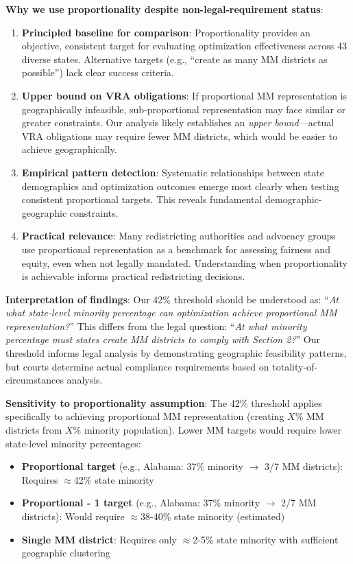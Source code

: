 \textbf{Why we use proportionality despite non-legal-requirement status}:

\begin{enumerate}
    \item \textbf{Principled baseline for comparison}: Proportionality provides an objective, consistent target for evaluating optimization effectiveness across 43 diverse states. Alternative targets (e.g., ``create as many MM districts as possible'') lack clear success criteria.

    \item \textbf{Upper bound on VRA obligations}: If proportional MM representation is geographically infeasible, sub-proportional representation may face similar or greater constraints. Our analysis likely establishes an \emph{upper bound}---actual VRA obligations may require fewer MM districts, which would be easier to achieve geographically.

    \item \textbf{Empirical pattern detection}: Systematic relationships between state demographics and optimization outcomes emerge most clearly when testing consistent proportional targets. This reveals fundamental demographic-geographic constraints.

    \item \textbf{Practical relevance}: Many redistricting authorities and advocacy groups use proportional representation as a benchmark for assessing fairness and equity, even when not legally mandated. Understanding when proportionality is achievable informs practical redistricting decisions.
\end{enumerate}

\textbf{Interpretation of findings}: Our 42\% threshold should be understood as: ``\emph{At what state-level minority percentage can optimization achieve proportional MM representation?}'' This differs from the legal question: ``\emph{At what minority percentage must states create MM districts to comply with Section 2?}'' Our threshold informs legal analysis by demonstrating geographic feasibility patterns, but courts determine actual compliance requirements based on totality-of-circumstances analysis.

\textbf{Sensitivity to proportionality assumption}: The 42\% threshold applies specifically to achieving proportional MM representation (creating $X$\% MM districts from $X$\% minority population). Lower MM targets would require lower state-level minority percentages:

\begin{itemize}
    \item \textbf{Proportional target} (e.g., Alabama: 37\% minority $\rightarrow$ 3/7 MM districts): Requires $\approx$42\% state minority
    \item \textbf{Proportional - 1 target} (e.g., Alabama: 37\% minority $\rightarrow$ 2/7 MM districts): Would require $\approx$38-40\% state minority (estimated)
    \item \textbf{Single MM district}: Requires only $\approx$2-5\% state minority with sufficient geographic clustering
\end{itemize}

